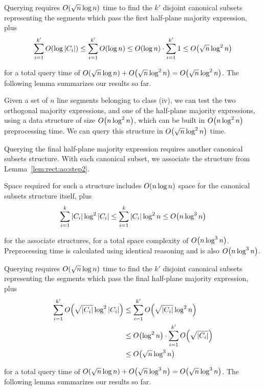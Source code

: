 Querying requires $O\!\left(\sqrt{n}\log{n}\right)$ time to find the $k'$ disjoint canonical subsets representing the segments which pass the first half-plane majority expression, plus
\[
\sum_{i=1}^{k'}{O\!\left(\log{|C_i|}\right)} 
\leq \sum_{i=1}^{k'}{O\!\left(\log{n}\right)}
\leq O\!\left(\log{n}\right) \cdot \sum_{i=1}^{k'}{1}
\leq O\!\left(\sqrt{n}\log^2{n}\right)
\]

\noindent for a total query time of $O\!\left(\sqrt{n}\log{n}\right) + O\!\left(\sqrt{n}\log^2{n}\right) = O\!\left(\sqrt{n}\log^2{n}\right)$. The following lemma summarizes our results so far.

\begin{lemma}
\label{lem:rect:ao:step2}
Given a set of $n$ line segments belonging to class (iv), we can test the two orthogonal majority expressions, and one of the half-plane majority expressions, using a data structure of size $O\!\left(n\log^2{n}\right)$, which can be built in $O\!\left(n\log^2{n}\right)$ preprocessing time. We can query this structure in $O\!\left(\sqrt{n}\log^2{n}\right)$ time.
\end{lemma}

Querying the final half-plane majority expression requires another canonical subsets structure. With each canonical subset, we associate the structure from Lemma~\ref{lem:rect:ao:step2}.

Space required for such a structure includes $O\!\left(n \log{n}\right)$ space for the canonical subsets structure itself, plus
\[
\sum_{i=1}^k{|C_i| \log^2{|C_i|}}
\leq \sum_{i=1}^k{|C_i| \log^2{n}} 
\leq O\!\left(n\log^3{n}\right)
\]

\noindent for the associate structures, for a total space complexity of $O\!\left(n\log^3{n}\right)$. Preprocessing time is calculated using identical reasoning and is also $O\!\left(n\log^3{n}\right)$.

Querying requires $O\!\left(\sqrt{n}\log{n}\right)$ time to find the $k'$ disjoint canonical subsets representing the segments which pass the final half-plane majority expression, plus
\[
\begin{split}
\sum_{i=1}^{k'}{\BigOh{\sqrt{|C_i|}\log^2{|C_i|}}} 
&\leq \sum_{i=1}^{k'}{\BigOh{\sqrt{|C_i|}\log^2{n}}} \\
%
&\leq \BigOh{\log^2{n}} \cdot \sum_{i=1}^{k'}{\BigOh{\sqrt{|C_i|}}} \\
%
&\leq \BigOh{\sqrt{n}\log^3{n}} \\
\end{split}
\]

\noindent for a total query time of $O\!\left(\sqrt{n}\log{n}\right) + O\!\left(\sqrt{n}\log^3{n}\right) = O\!\left(\sqrt{n}\log^3{n}\right)$. The following lemma summarizes our results so far.


